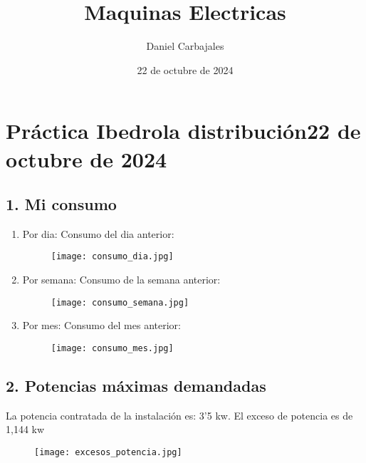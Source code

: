 \documentclass{report}
\title{\Huge{Maquinas Electricas}}
\author{\large{Daniel Carbajales}}
\date{22 de octubre de 2024}
\begin{document}
  \section*{Práctica Ibedrola distribución\hfill22 de octubre de 2024}
    \subsection*{1. Mi consumo}
      \begin{enumerate}[label=\alph*)]
        \item{Por dia: }Consumo del dia anterior: 
          \begin{figure}[h]
            \centering
            \texttt{[image: consumo\_dia.jpg]}
          \end{figure}
        \item{Por semana: }Consumo de la semana anterior:
          \begin{figure}[h]
            \centering
            \texttt{[image: consumo\_semana.jpg]}
          \end{figure}
          \newpage
        \item{Por mes: }Consumo del mes anterior:
          \begin{figure}[h]
            \centering
            \texttt{[image: consumo\_mes.jpg]}
          \end{figure}

      \end{enumerate}
      \subsection*{2. Potencias máximas demandadas}
        La potencia contratada de la instalación es: 3'5 kw.
        El exceso de potencia es de 1,144 kw
        \begin{figure}[h]
          \centering
          \texttt{[image: excesos\_potencia.jpg]}
        \end{figure}
\newpage
\end{document}
